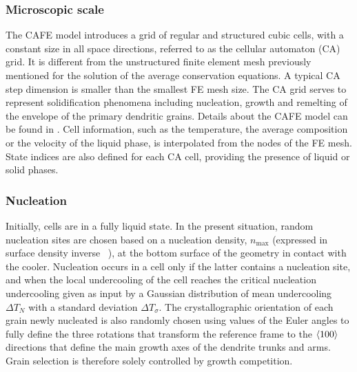 \subsubsection{Microscopic scale}
The CAFE model introduces a grid of regular and structured cubic cells, with a constant size 
in all space directions, referred to as the cellular automaton (CA) grid. It is different from 
the unstructured finite element mesh previously mentioned for the solution of the average conservation 
equations. A typical CA step dimension is smaller than the smallest FE mesh size. The CA grid serves to 
represent solidification phenomena including nucleation, growth and remelting of the envelope of the 
primary dendritic grains. Details about the CAFE model can be found in \citep{carozzani_3d_2012,carozzani_direct_2013,carozzani_optimized_2014}. 
Cell information, such as the temperature, the average composition or the velocity of the liquid phase, is interpolated from 
the nodes of the FE mesh. State indices are also defined for each CA cell, providing the presence of liquid or solid phases. 

\subsubsection{Nucleation}
Initially, cells are in a fully liquid state. In the present situation, random nucleation sites are 
chosen based on a nucleation density, $n_\text{max}$ (expressed in surface density inverse \si{\per \uarea}), at the 
bottom surface of the geometry in contact with the cooler. Nucleation occurs in a cell only if the 
latter contains a nucleation site, and when the local undercooling of the cell reaches the critical 
nucleation undercooling given as input by a Gaussian distribution of mean undercooling $\Delta T_N$ with a 
standard deviation $\Delta T_\sigma$. The crystallographic orientation of each grain newly nucleated is also randomly 
chosen using values of the Euler angles to fully define the three rotations that transform the reference 
frame to the $\left \langle 100 \right \rangle$ directions that define the main growth axes of the dendrite trunks and arms. Grain 
selection is therefore solely controlled by growth competition.

